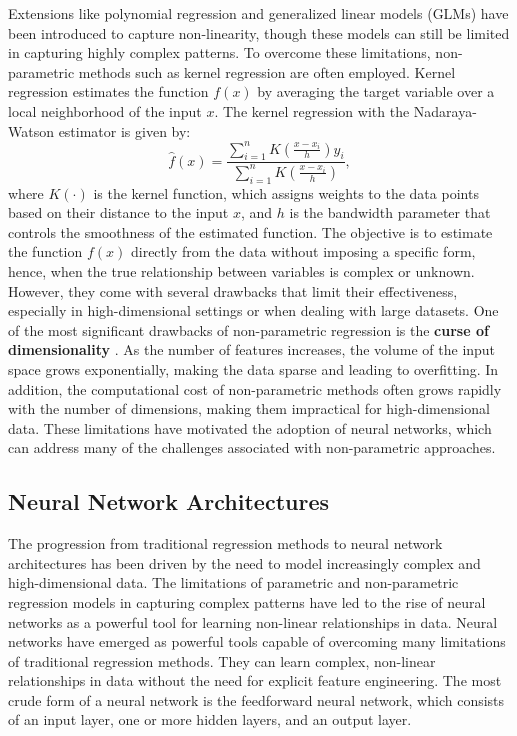Extensions like polynomial regression and generalized linear models (GLMs) have been introduced to capture non-linearity, though these models can still be limited in capturing highly complex patterns. 
To overcome these limitations, non-parametric methods such as kernel regression \citep{hastie2009elements} are often employed. 
Kernel regression estimates the function $f(x)$ by averaging the target variable over a local neighborhood of the input $x$.
The kernel regression with the Nadaraya-Watson estimator is given by:
\begin{equation}
    \hat{f}(x) = \frac{\sum_{i=1}^{n} K\left(\frac{x-x_i}{h}\right) y_i}{\sum_{i=1}^{n} K\left(\frac{x-x_i}{h}\right)},
\end{equation}
where $K(\cdot)$ is the kernel function, which assigns weights to the data points based on their distance to the input $x$, and $h$ is the bandwidth parameter that controls the smoothness of the estimated function.
The objective is to estimate the function $f(x)$ directly from the data without imposing a specific form, hence, when the true relationship between variables is complex or unknown.
However, they come with several drawbacks that limit their effectiveness, especially in high-dimensional settings or when dealing with large datasets. 
One of the most significant drawbacks of non-parametric regression is the \textbf{curse of dimensionality} \cite{bellman1966dynamic}. 
As the number of features increases, the volume of the input space grows exponentially, making the data sparse and leading to overfitting.
In addition, the computational cost of non-parametric methods often grows rapidly with the number of dimensions, making them impractical for high-dimensional data. 
These limitations have motivated the adoption of neural networks, which can address many of the challenges associated with non-parametric approaches.

\subsection{Neural Network Architectures}

The progression from traditional regression methods to neural network architectures has been driven by the need to model increasingly complex and high-dimensional data.
The limitations of parametric and non-parametric regression models in capturing complex patterns have led to the rise of neural networks as a powerful tool for learning non-linear relationships in data.
Neural networks have emerged as powerful tools capable of overcoming many limitations of traditional regression methods. 
They can learn complex, non-linear relationships in data without the need for explicit feature engineering.
The most crude form of a neural network is the feedforward neural network, which consists of an input layer, one or more hidden layers, and an output layer.





